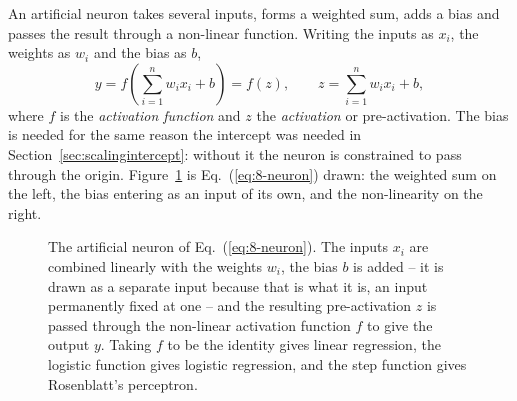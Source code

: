 An artificial neuron takes several inputs, forms a weighted sum, adds a bias
and passes the result through a non-linear function.  Writing the inputs as
$x_i$, the weights as $w_i$ and the bias as $b$,
\begin{equation}
  y = f\left(\sum_{i=1}^{n}w_ix_i+b\right) = f(z),
  \qquad z = \sum_{i=1}^{n}w_ix_i+b,
  \label{eq:8-neuron}
\end{equation}
where $f$ is the \emph{activation function} and $z$ the \emph{activation} or
pre-activation.  The bias is needed for the same reason the intercept was
needed in Section~\ref{sec:scalingintercept}: without it the neuron is
constrained to pass through the origin.  Figure~\ref{fig:8-neuron} is
Eq.~(\ref{eq:8-neuron}) drawn: the weighted sum on the left, the bias entering
as an input of its own, and the non-linearity on the right.

\begin{figure}[htbp]
\centering
{}
\caption{The artificial neuron of Eq.~(\ref{eq:8-neuron}).  The inputs $x_i$
are combined linearly with the weights $w_i$, the bias $b$ is added -- it is
drawn as a separate input because that is what it is, an input permanently
fixed at one -- and the resulting pre-activation $z$ is passed through the
non-linear activation function $f$ to give the output $y$.  Taking $f$ to be
the identity gives linear regression, the logistic function gives logistic
regression, and the step function gives Rosenblatt's perceptron.}
\label{fig:8-neuron}
\end{figure}

